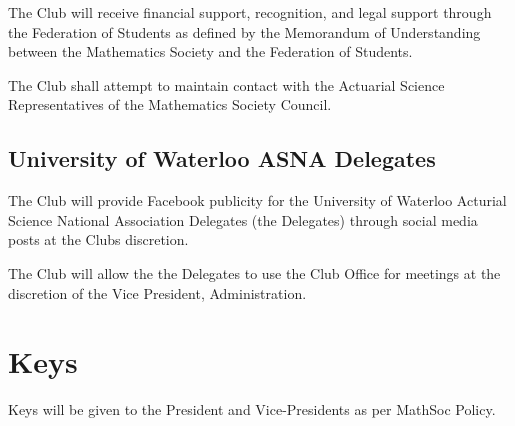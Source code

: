 \documentclass[11pt]{mathsoc}
\begin{document}
The Club will receive financial support, recognition, and legal 
support through the Federation of Students as defined by the Memorandum of 
Understanding between the Mathematics Society and the Federation of Students.

The Club shall attempt to maintain contact with the Actuarial Science 
Representatives of the Mathematics Society Council.

\subsection{University of Waterloo ASNA Delegates}
The Club will provide Facebook publicity for the University of Waterloo
Acturial Science National Association Delegates (the Delegates) through social media posts
at the Clubs discretion.

The Club will allow the the Delegates to use the Club Office for meetings at the discretion
of the Vice President, Administration.

\section{Keys}
Keys will be given to the President and Vice-Presidents as per MathSoc Policy.
\end{document}
